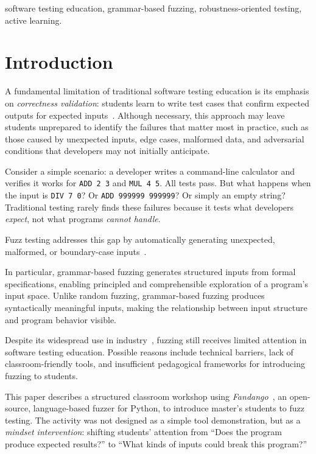\documentclass[conference]{IEEEtran}
\begin{document}
\begin{IEEEkeywords}
software testing education, grammar-based fuzzing, robustness-oriented testing, active learning.
\end{IEEEkeywords}

\section{Introduction}
\label{sec:intro}

A fundamental limitation of traditional software testing education is its emphasis on \emph{correctness validation}: students learn to write test cases that confirm expected outputs for expected inputs~\cite{garousi2020testing}. Although necessary, this approach may leave students unprepared to identify the failures that matter most in practice, such as those caused by unexpected inputs, edge cases, malformed data, and adversarial conditions that developers may not initially anticipate.

Consider a simple scenario: a developer writes a command-line calculator and verifies it works for \texttt{ADD 2 3} and \texttt{MUL 4 5}.
All tests pass.
But what happens when the input is \texttt{DIV 7 0}?
Or \texttt{ADD 999999 999999}?
Or simply an empty string?
Traditional testing rarely finds these failures because it tests what developers \emph{expect}, not what programs \emph{cannot handle}.

Fuzz testing addresses this gap by automatically generating unexpected, malformed, or boundary-case inputs~\cite{miller1990empirical}.

In particular, grammar-based fuzzing generates structured inputs from formal specifications, enabling principled and comprehensible exploration of a program's input space. Unlike random fuzzing, grammar-based fuzzing produces syntactically meaningful inputs, making the relationship between input structure and program behavior visible.

Despite its widespread use in industry~\cite{manes2019art}, fuzzing still receives limited attention in software testing education.
Possible reasons include technical barriers, lack of classroom-friendly tools, and insufficient pedagogical frameworks for introducing fuzzing to students.

This paper describes a structured classroom workshop using \emph{Fandango}~\cite{zamudio2025fandango}, an open-source, language-based fuzzer for Python, to introduce master's students to fuzz testing.
The activity was not designed as a simple tool demonstration, but as a \emph{mindset intervention}: shifting students' attention from ``Does the program produce expected results?'' to ``What kinds of inputs could break this program?''
\end{document}
